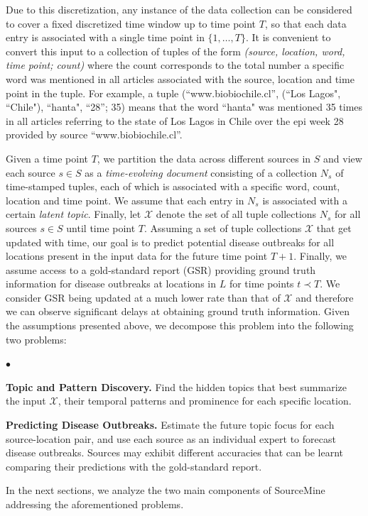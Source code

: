 \documentclass[conference]{IEEEtran}
\newcommand{\squishlist}{
   \begin{list}{$\bullet$}
    {
      \setlength{\itemsep}{0pt}
      \setlength{\parsep}{3pt}
      \setlength{\topsep}{3pt}
      \setlength{\partopsep}{0pt}
      \setlength{\leftmargin}{1.5em}
      \setlength{\labelwidth}{1em}
      \setlength{\labelsep}{0.5em} } }
\newcommand{\squishend}{
    \end{list}  }
\newcommand{\fullmodel}{{{\sf SourceMine}}\xspace}
\begin{document}
Due to this discretization, any instance of the data collection can be considered to cover a fixed discretized time window up to time point $T$, so that each data entry is associated with a single time point in $\{1, \dots,T\}$. It is convenient to convert this input to a collection of tuples of the form {\em (source, location, word, time point; count)} where the count corresponds to the total number a specific word was mentioned in all articles associated with the source, location and time point in the tuple. For example, a tuple (``www.biobiochile.cl'', (``Los Lagos", ``Chile"), ``hanta", ``28''; 35) means that the word ``hanta" was mentioned 35 times in all articles referring to the state of Los Lagos in Chile over the epi week 28 provided by source ``www.biobiochile.cl''.  

Given a time point $T$, we partition the data across different sources in $S$ and view each source $s \in S$ as a {\em time-evolving document} consisting of a collection $N_s$ of time-stamped tuples, each of which is associated with a specific word, count, location and time point. We assume that each entry in $N_s$ is associated with a certain {\em latent topic}. Finally, let $\mathcal{X}$ denote the set of all tuple collections $N_s$ for all sources $s \in S$ until time point $T$. Assuming a set of tuple collections $\mathcal{X}$ that get updated with time, our goal is to predict potential disease outbreaks for all locations present in the input data for the future time point $T+1$. Finally, we assume access to a gold-standard report (GSR) providing ground truth information for disease outbreaks at locations in $L$ for time points $t \prec T$. We consider GSR being updated at a much lower rate than that of $\mathcal{X}$ and therefore we can observe significant delays at obtaining ground truth information. Given the assumptions presented above, we decompose this problem into the following two problems:
\squishlist
\item {\bf Topic and Pattern Discovery.} Find the hidden topics that best summarize the input $\mathcal{X}$, their temporal patterns and prominence for each specific location.
\item {\bf Predicting Disease Outbreaks.} Estimate the future topic focus for each source-location pair, and use each source as an individual expert to forecast disease outbreaks. Sources may exhibit different accuracies that can be learnt comparing their predictions with the gold-standard report.
\squishend
In the next sections, we analyze the two main components of \fullmodel addressing the aforementioned problems.
\end{document}
